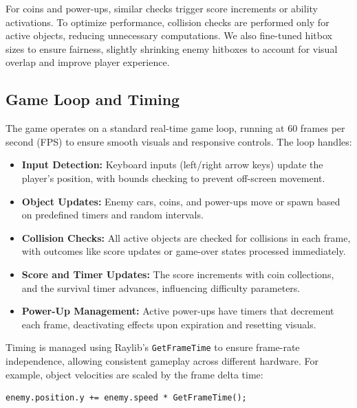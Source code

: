 \documentclass[12pt,a4paper]{article}
\begin{document}
For coins and power-ups, similar checks trigger score increments or ability activations. To optimize performance, collision checks are performed only for active objects, reducing unnecessary computations. We also fine-tuned hitbox sizes to ensure fairness, slightly shrinking enemy hitboxes to account for visual overlap and improve player experience. \\

\subsection{Game Loop and Timing}

The game operates on a standard real-time game loop, running at 60 frames per second (FPS) to ensure smooth visuals and responsive controls. The loop handles: \\

\begin{itemize}
    \item \textbf{Input Detection:} Keyboard inputs (left/right arrow keys) update the player’s position, with bounds checking to prevent off-screen movement. \\
    \item \textbf{Object Updates:} Enemy cars, coins, and power-ups move or spawn based on predefined timers and random intervals. \\
    \item \textbf{Collision Checks:} All active objects are checked for collisions in each frame, with outcomes like score updates or game-over states processed immediately. \\
    \item \textbf{Score and Timer Updates:} The score increments with coin collections, and the survival timer advances, influencing difficulty parameters. \\
    \item \textbf{Power-Up Management:} Active power-ups have timers that decrement each frame, deactivating effects upon expiration and resetting visuals. \\
\end{itemize}

Timing is managed using Raylib’s \texttt{GetFrameTime} to ensure frame-rate independence, allowing consistent gameplay across different hardware. For example, object velocities are scaled by the frame delta time: \\

\begin{verbatim}
enemy.position.y += enemy.speed * GetFrameTime();
\end{verbatim}
\end{document}
